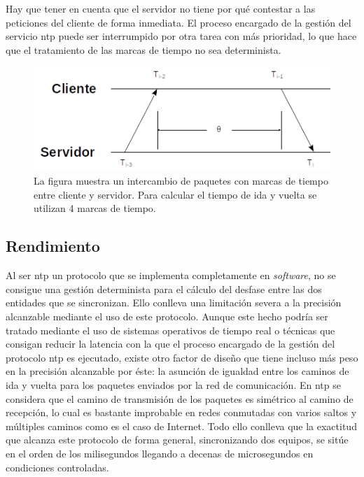 Hay que tener en cuenta que el servidor no tiene por qué contestar a las 
peticiones del cliente de forma inmediata. El proceso encargado de la gestión 
del servicio \gls{ntp} puede ser interrumpido por otra tarea con más prioridad, 
lo que hace que el tratamiento de las marcas de tiempo no sea determinista.

\begin{figure}
	\centering
	\includegraphics[width=0.7\linewidth]{imagenes/ntp_ts}
	\caption[Cálculo del desfase entre cliente y servidor]{La figura muestra un 
	intercambio de paquetes con marcas de tiempo entre cliente y servidor. Para 
	calcular el tiempo de ida y vuelta se utilizan 4 marcas de tiempo.}
	\label{fig:ntpts}
\end{figure}

\subsection{Rendimiento}

Al ser \gls{ntp} un protocolo que se implementa completamente en 
\textit{software}, no se consigue una gestión determinista para el cálculo del 
desfase entre las dos entidades que se sincronizan. Ello conlleva una 
limitación severa a la precisión alcanzable mediante el uso de este protocolo. 
Aunque este hecho podría ser tratado mediante el 
uso de sistemas operativos de tiempo real o técnicas que consigan reducir la 
latencia con la que el proceso encargado de la gestión del protocolo \gls{ntp} 
es ejecutado, existe otro factor de diseño que tiene incluso más peso en la 
precisión alcanzable por éste: la asunción de igualdad entre los caminos de ida 
y vuelta para los paquetes enviados por la red de comunicación. En \gls{ntp} se 
considera que el camino de transmisión de los paquetes es simétrico al camino 
de recepción, lo cual es bastante improbable en redes conmutadas con varios 
saltos y múltiples caminos como es el caso de Internet. Todo ello conlleva que 
la exactitud que alcanza este protocolo de forma general, sincronizando dos 
equipos, se sitúe en el orden de los milisegundos llegando a decenas de 
microsegundos en condiciones controladas.